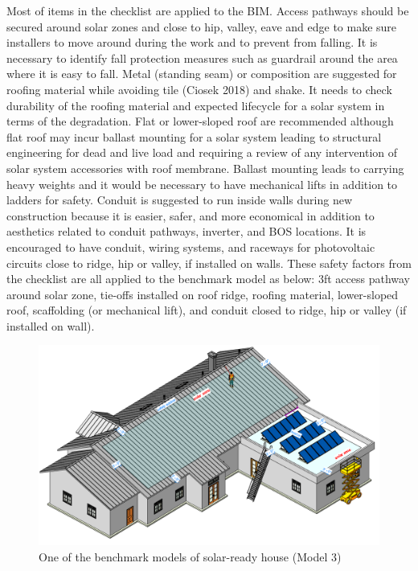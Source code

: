 \documentclass[]{article}
\begin{document}
Most of items in the checklist are applied to the BIM. Access pathways
should be secured around solar zones and close to hip, valley, eave and
edge to make sure installers to move around during the work and to
prevent from falling. It is necessary to identify fall protection
measures such as guardrail around the area where it is easy to fall.
Metal (standing seam) or composition are suggested for roofing material
while avoiding tile (Ciosek 2018) and shake. It needs to check
durability of the roofing material and expected lifecycle for a solar
system in terms of the degradation. Flat or lower-sloped roof are
recommended although flat roof may incur ballast mounting for a solar
system leading to structural engineering for dead and live load and
requiring a review of any intervention of solar system accessories with
roof membrane. Ballast mounting leads to carrying heavy weights and it
would be necessary to have mechanical lifts in addition to ladders for
safety. Conduit is suggested to run inside walls during new construction
because it is easier, safer, and more economical in addition to
aesthetics related to conduit pathways, inverter, and BOS locations. It
is encouraged to have conduit, wiring systems, and raceways for
photovoltaic circuits close to ridge, hip or valley, if installed on
walls. These safety factors from the checklist are all applied to the
benchmark model as below: 3ft access pathway around solar zone, tie-offs
installed on roof ridge, roofing material, lower-sloped roof,
scaffolding (or mechanical lift), and conduit closed to ridge, hip or
valley (if installed on wall).

\begin{figure}
\centering
\includegraphics{3d_3.png}
\caption{One of the benchmark models of solar-ready house (Model 3)}
\end{figure}
\end{document}
